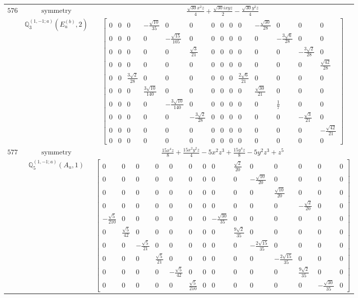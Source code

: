 \documentclass[fleqn,8pt,landscape]{jsarticle}
\begin{document}
\begin{longtable}{ccc}
$ 576 $ & $ \text{symmetry} $ & $ \frac{\sqrt{30} x^{2} z}{4} + \frac{\sqrt{30} i x y z}{2} - \frac{\sqrt{30} y^{2} z}{4} $ \\
$  $ & $ \mathbb{Q}_{3}^{(1,-1;a)}(E_{u}^{(b)},2) $ & $ \begin{bmatrix} 0 & 0 & 0 & - \frac{\sqrt{10}}{35} & 0 & 0 & 0 & 0 & 0 & 0 & - \frac{\sqrt{30}}{28} & 0 & 0 & 0 \\ 0 & 0 & 0 & 0 & - \frac{\sqrt{15}}{105} & 0 & 0 & 0 & 0 & 0 & 0 & - \frac{3 \sqrt{6}}{28} & 0 & 0 \\ 0 & 0 & 0 & 0 & 0 & \frac{\sqrt{3}}{21} & 0 & 0 & 0 & 0 & 0 & 0 & - \frac{3 \sqrt{2}}{28} & 0 \\ 0 & 0 & 0 & 0 & 0 & 0 & 0 & 0 & 0 & 0 & 0 & 0 & 0 & \frac{\sqrt{42}}{28} \\ 0 & 0 & \frac{3 \sqrt{2}}{28} & 0 & 0 & 0 & 0 & 0 & 0 & \frac{2 \sqrt{6}}{21} & 0 & 0 & 0 & 0 \\ 0 & 0 & 0 & \frac{3 \sqrt{10}}{140} & 0 & 0 & 0 & 0 & 0 & 0 & \frac{\sqrt{30}}{21} & 0 & 0 & 0 \\ 0 & 0 & 0 & 0 & - \frac{3 \sqrt{10}}{140} & 0 & 0 & 0 & 0 & 0 & 0 & \frac{1}{7} & 0 & 0 \\ 0 & 0 & 0 & 0 & 0 & - \frac{3 \sqrt{2}}{28} & 0 & 0 & 0 & 0 & 0 & 0 & - \frac{\sqrt{3}}{21} & 0 \\ 0 & 0 & 0 & 0 & 0 & 0 & 0 & 0 & 0 & 0 & 0 & 0 & 0 & - \frac{\sqrt{42}}{21} \\ 0 & 0 & 0 & 0 & 0 & 0 & 0 & 0 & 0 & 0 & 0 & 0 & 0 & 0 \end{bmatrix} $ \\ \hline
$ 577 $ & $ \text{symmetry} $ & $ \frac{15 x^{4} z}{8} + \frac{15 x^{2} y^{2} z}{4} - 5 x^{2} z^{3} + \frac{15 y^{4} z}{8} - 5 y^{2} z^{3} + z^{5} $ \\
$  $ & $ \mathbb{Q}_{5}^{(1,-1;a)}(A_{u},1) $ & $ \begin{bmatrix} 0 & 0 & 0 & 0 & 0 & 0 & 0 & 0 & \frac{\sqrt{2}}{20} & 0 & 0 & 0 & 0 & 0 \\ 0 & 0 & 0 & 0 & 0 & 0 & 0 & 0 & 0 & - \frac{\sqrt{10}}{20} & 0 & 0 & 0 & 0 \\ 0 & 0 & 0 & 0 & 0 & 0 & 0 & 0 & 0 & 0 & \frac{\sqrt{10}}{20} & 0 & 0 & 0 \\ 0 & 0 & 0 & 0 & 0 & 0 & 0 & 0 & 0 & 0 & 0 & - \frac{\sqrt{2}}{20} & 0 & 0 \\ - \frac{\sqrt{5}}{210} & 0 & 0 & 0 & 0 & 0 & 0 & - \frac{\sqrt{30}}{35} & 0 & 0 & 0 & 0 & 0 & 0 \\ 0 & \frac{\sqrt{5}}{42} & 0 & 0 & 0 & 0 & 0 & 0 & \frac{9 \sqrt{2}}{35} & 0 & 0 & 0 & 0 & 0 \\ 0 & 0 & - \frac{\sqrt{5}}{21} & 0 & 0 & 0 & 0 & 0 & 0 & - \frac{2 \sqrt{15}}{35} & 0 & 0 & 0 & 0 \\ 0 & 0 & 0 & \frac{\sqrt{5}}{21} & 0 & 0 & 0 & 0 & 0 & 0 & - \frac{2 \sqrt{15}}{35} & 0 & 0 & 0 \\ 0 & 0 & 0 & 0 & - \frac{\sqrt{5}}{42} & 0 & 0 & 0 & 0 & 0 & 0 & \frac{9 \sqrt{2}}{35} & 0 & 0 \\ 0 & 0 & 0 & 0 & 0 & \frac{\sqrt{5}}{210} & 0 & 0 & 0 & 0 & 0 & 0 & - \frac{\sqrt{30}}{35} & 0 \end{bmatrix} $ \\ \hline

\end{longtable}
\end{document}
